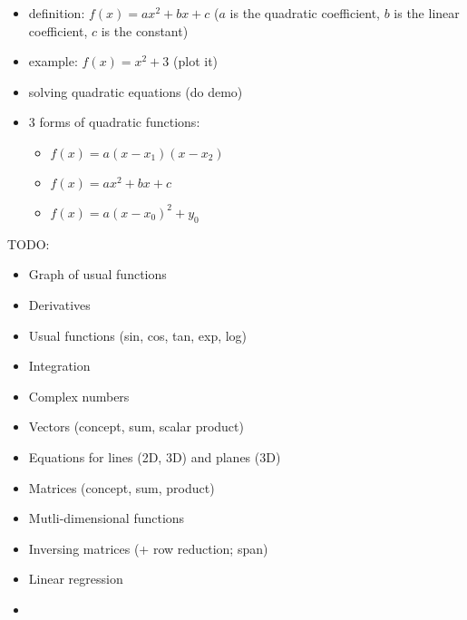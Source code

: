 \begin{itemize}
\tightlist
\item
  definition: \(f(x) = ax^2+bx+c\) (\(a\) is the quadratic coefficient,
  \(b\) is the linear coefficient, \(c\) is the constant)
\item
  example: \(f(x) = x^2+3\) (plot it)
\item
  solving quadratic equations (do demo)
\item
  3 forms of quadratic functions:

  \begin{itemize}
  \tightlist
  \item
    \(f(x) = a(x-x_1)(x-x_2)\)
  \item
    \(f(x) = ax^2+bx+c\)
  \item
    \(f(x) = a(x-x_0)^2+y_0\)
  \end{itemize}
\end{itemize}

TODO:

\begin{itemize}
\tightlist
\item
  Graph of usual functions
\item
  Derivatives
\item
  Usual functions (sin, cos, tan, exp, log)
\item
  Integration
\item
  Complex numbers
\item
  Vectors (concept, sum, scalar product)
\item
  Equations for lines (2D, 3D) and planes (3D)
\item
  Matrices (concept, sum, product)
\item
  Mutli-dimensional functions
\item
  Inversing matrices (+ row reduction; span)
\item
  Linear regression
\item
\end{itemize}
